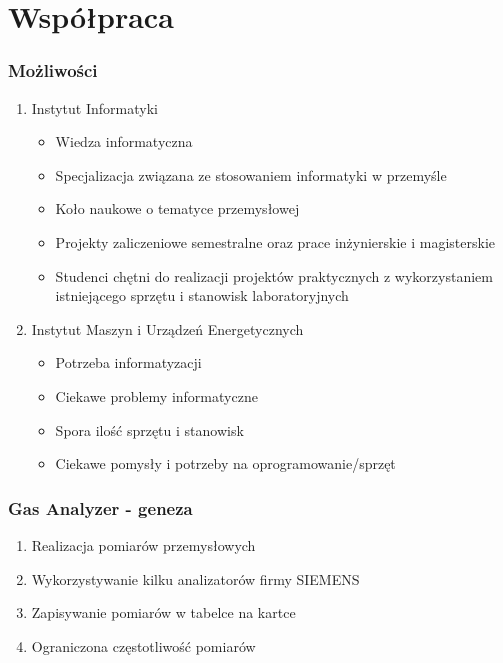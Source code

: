 \documentclass[ucs]{beamer}
\begin{document}
\section{Współpraca}
\begin{frame}
\frametitle{Możliwości}
\begin{enumerate}
\item Instytut Informatyki
\begin{itemize}
\item Wiedza informatyczna
\item Specjalizacja związana ze stosowaniem informatyki w przemyśle
\item Koło naukowe o tematyce przemysłowej
\item Projekty zaliczeniowe semestralne oraz prace inżynierskie i magisterskie
\item Studenci chętni do realizacji projektów praktycznych z wykorzystaniem istniejącego sprzętu i stanowisk laboratoryjnych
\end{itemize} 
\item Instytut Maszyn i Urządzeń Energetycznych
\begin{itemize}
\item Potrzeba informatyzacji
\item Ciekawe problemy informatyczne
\item Spora ilość sprzętu i stanowisk
\item Ciekawe pomysły i potrzeby na oprogramowanie/sprzęt
\end{itemize}
\end{enumerate}
\end{frame}

\begin{frame}
\frametitle{Gas Analyzer - geneza}
\begin{enumerate}
\item Realizacja pomiarów przemysłowych
\item Wykorzystywanie kilku analizatorów firmy SIEMENS
\item Zapisywanie pomiarów w tabelce na kartce
\item Ograniczona częstotliwość pomiarów
\end{enumerate}
\end{frame}
\end{document}
